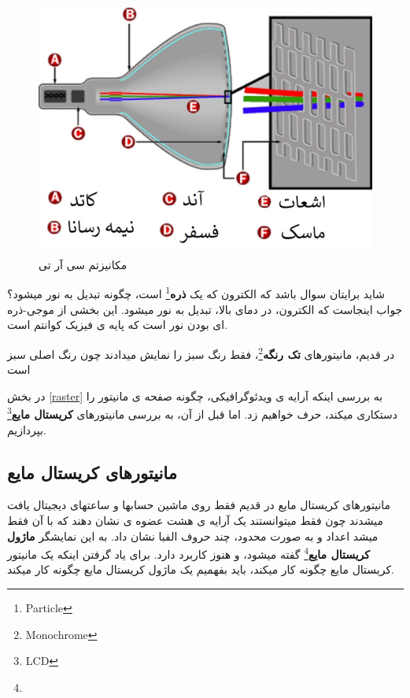 \documentclass[14pt,a4paper]{memoir}
\begin{document}
	 \begin{figure}[H]
	 	\centering
	 	\includegraphics[scale=0.5]{CRT}
	 	\caption{مکانیزتم سی آر تی}
	 \end{figure}
	 
	 
	 \begin{tip}
	 	شاید برایتان سوال باشد که الکترون که یک \textbf{ذره}\footnote{Particle} است، چگونه تبدیل به نور میشود؟ جواب اینجاست که الکترون، در دمای بالا، تبدیل به نور میشود. این بخشی از موجی-ذره ای بودن نور است که پایه ی فیزیک کوانتم است.
	 \end{tip}
	 
	 \begin{tip}
	 	در قدیم، مانیتورهای \textbf{تک رنگه}\footnote{Monochrome}، فقط رنگ سبز را نمایش میدادند چون رنگ اصلی  سبز است
	 \end{tip}
	 
	 
	 در بخش \ref{raster} به بررسی اینکه آرایه ی ویدئوگرافیکی، چگونه صفحه ی مانیتور را دستکاری میکند، حرف خواهیم زد. اما قبل از آن، به بررسی مانیتورهای \textbf{کریستال مایع}\footnote{LCD} بپردازیم.
	 
	 \subsection{مانیتورهای کریستال مایع}\label{lcd}
	 
	 مانیتورهای کریستال مایع در قدیم فقط روی  ماشین حسابها و ساعتهای دیجیتال یافت میشدند چون فقط میتوانستند یک آرایه ی هشت عضوه ی نشان دهند که با آن فقط میشد اعداد و به صورت محدود، چند حروف الفبا نشان داد. به این نمایشگر \textbf{ماژول کریستال مایع}\footnote{} گفته میشود، و هنوز کاربرد دارد. برای یاد گرفتن اینکه یک مانیتور کریستال مایع چگونه کار میکند، باید بفهمیم یک ماژول کریستال مایع چگونه کار میکند.
	 
\end{document}
